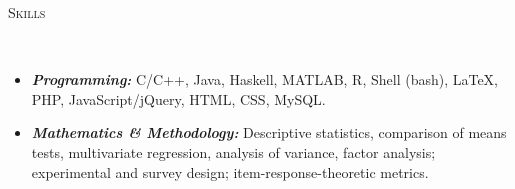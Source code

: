 \documentclass[9pt]{article}
\newenvironment{changemargin}[2]{%
  \begin{list}{}{%
    \setlength{\topsep}{0pt}%
    \setlength{\leftmargin}{#1}%
    \setlength{\rightmargin}{#2}%
    \setlength{\listparindent}{\parindent}%
    \setlength{\itemindent}{\parindent}%
    \setlength{\parsep}{\parskip}%
  }%
  \item[]}{\end{list}
}
\newcommand{\lineover}{
	\begin{changemargin}{-0.05in}{-0.05in}
		\vspace*{-8pt}
		\hrulefill \\
		\vspace*{-2pt}
	\end{changemargin}
}
\newcommand{\header}[1]{
	\begin{changemargin}{-0.5in}{-0.5in}
		\large \scshape{#1}\\
  	\lineover
	\end{changemargin}
}
\newenvironment{body} {
	\vspace*{-16pt}
	\begin{changemargin}{-0.25in}{-0.5in}
  }	
	{\end{changemargin}
}
\begin{document}
\vspace{24pt}
\header{Skills}
\vspace{16pt}
\begin{body}
     \begin{itemize}
	\item \emph{\textbf{Programming:}}{}   C/C++, Java, Haskell, MATLAB, R, Shell (bash), \LaTeX, PHP, JavaScript/jQuery, HTML, 
	                                       CSS, MySQL.
        \medskip
	\item \emph{\textbf{Mathematics \& Methodology:}}{} Descriptive statistics, comparison of means tests, multivariate regression, 
	analysis of variance, factor analysis; experimental and survey design; item-response-theoretic metrics.
     \end{itemize}
\end{body}
\smallskip
\end{document}
